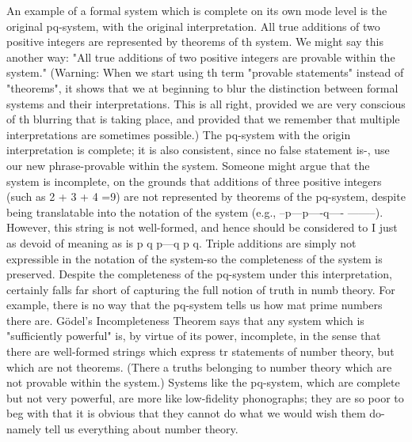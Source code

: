 An example of a formal system which is complete on its own mode level is the original pq-system, with the original interpretation. All true additions of two positive integers are represented by theorems of th system. We might say this another way: "All true additions of two positive integers are provable within the system." (Warning: When we start using th term "provable statements" instead of "theorems", it shows that we at beginning to blur the distinction between formal systems and their interpretations. This is all right, provided we are very conscious of th blurring that is taking place, and provided that we remember that multiple interpretations are sometimes possible.) The pq-system with the origin interpretation is complete; it is also consistent, since no false statement is-, use our new phrase-provable within the system. Someone might argue that the system is incomplete, on the grounds that additions of three positive integers (such as 2 + 3 + 4 =9) are not represented by theorems of the pq-system, despite being translatable into the notation of the system (e.g., --p---p----q---- --------). However, this string is not well-formed, and hence should be considered to I just as devoid of meaning as is p q p---q p q. Triple additions are simply not expressible in the notation of the system-so the completeness of the system is preserved. Despite the completeness of the pq-system under this interpretation, certainly falls far short of capturing the full notion of truth in numb theory. For example, there is no way that the pq-system tells us how mat prime numbers there are. Gödel’s Incompleteness Theorem says that any system which is "sufficiently powerful" is, by virtue of its power, incomplete, in the sense that there are well-formed strings which express tr statements of number theory, but which are not theorems. (There a truths belonging to number theory which are not provable within the system.) Systems like the pq-system, which are complete but not very powerful, are more like low-fidelity phonographs; they are so poor to beg with that it is obvious that they cannot do what we would wish them do-namely tell us everything about number theory. 







